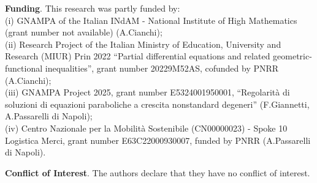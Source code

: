 \documentclass[leqno,11pt]{amsart}%
\numberwithin{equation}{section}
\theoremstyle{definition}
\numberwithin{equation}{section}
\begin{document}
\smallskip
\par\noindent
{\bf Funding}. This research was partly funded by:
\\ (i) GNAMPA   of the Italian INdAM - National Institute of High Mathematics (grant number not available)  (A.Cianchi);
\\ (ii) Research Project   of the Italian Ministry of Education, University and
Research (MIUR) Prin 2022 ``Partial differential equations and related geometric-functional inequalities'',
grant number 20229M52AS, cofunded by PNRR (A.Cianchi);
\\ (iii)  GNAMPA Project 2025, grant number E5324001950001, ``Regolarità di soluzioni di equazioni paraboliche a crescita nonstandard degeneri'' (F.Giannetti, A.Passarelli di Napoli);
\\(iv)   Centro Nazionale per la Mobilità Sostenibile (CN00000023) - Spoke 10 Logistica Merci, grant number E63C22000930007,  funded by PNRR (A.Passarelli di Napoli).


\bigskip
\par\noindent
{\bf Conflict of Interest}. The authors declare that they have no conflict of interest.
\end{document}
